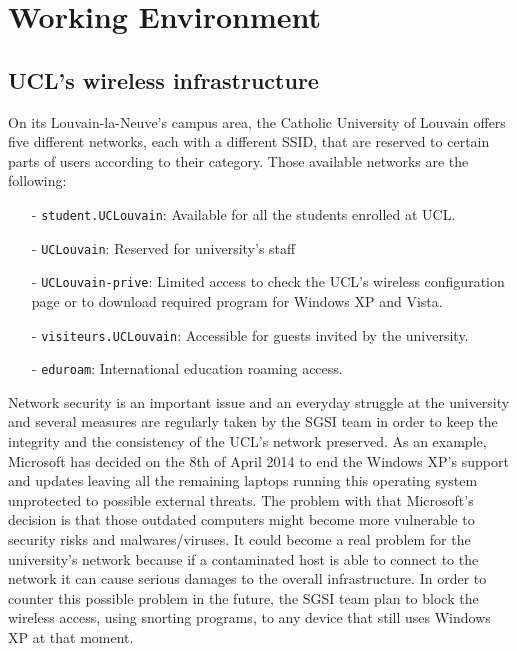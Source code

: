 
\chapter{Working Environment} %

\label{Chapter2} %




\section{UCL's wireless infrastructure}

On its Louvain-la-Neuve's campus area, the Catholic University of Louvain offers five different networks, each with a different SSID, that are reserved to certain parts of users according to their category. Those available networks are the following:
\begin{itemize}
	\item[-] \texttt{student.UCLouvain}: Available for all the students enrolled at UCL.
	\item[-] \texttt{UCLouvain}: Reserved for university's staff
	\item[-] \texttt{UCLouvain-prive}: Limited access to check the UCL's wireless configuration page or to download required program for Windows XP and Vista.
	\item[-] \texttt{visiteurs.UCLouvain}: Accessible for guests invited by the university.
	\item[-] \texttt{eduroam}: International education roaming access.
\end{itemize}

Network security is an important issue and an everyday struggle at the university and several measures are regularly taken by the SGSI team in order to keep the integrity and the consistency of the UCL's network preserved. As an example, Microsoft has decided on the 8th of April 2014 to end the Windows XP's support and updates leaving all the remaining laptops running this operating system unprotected to possible external threats\cite{windows}. The problem with that Microsoft's decision is that those outdated computers might become more vulnerable to security risks and malwares/viruses. It could become a real problem for the university's network because if a contaminated host is able to connect to the network it can cause serious damages to the overall infrastructure. In order to counter this possible problem in the future, the SGSI team plan to block the wireless access, using snorting programs, to any device that still uses Windows XP at that moment.

